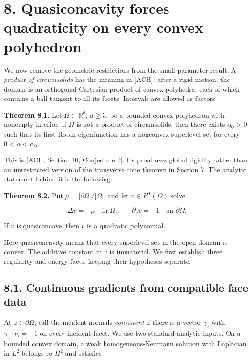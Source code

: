 \documentclass[11pt]{article}
\begin{document}
\section{8. Quasiconcavity forces quadraticity on every convex
polyhedron}\label{quasiconcavity-forces-quadraticity-on-every-convex-polyhedron}

We now remove the geometric restrictions from the small-parameter
result. A \emph{product of circumsolids} has the meaning in {[}ACH{]}:
after a rigid motion, the domain is an orthogonal Cartesian product of
convex polyhedra, each of which contains a ball tangent to all its
facets. Intervals are allowed as factors.

\textbf{Theorem 8.1.} Let \(\Omega\subset\mathbb R^d\), \(d\ge3\), be a
bounded convex polyhedron with nonempty interior. If \(\Omega\) is not a
product of circumsolids, then there exists \(\alpha_0>0\) such that its
first Robin eigenfunction has a nonconvex superlevel set for every
\(0<\alpha<\alpha_0\).

This is {[}ACH, Section 10, Conjecture 2{]}. Its proof uses global
rigidity rather than an unrestricted version of the transverse cone
theorem in Section 7. The analytic statement behind it is the following.

\textbf{Theorem 8.2.} Put \(\mu=|\partial\Omega|/|\Omega|\), and let
\(v\in H^1(\Omega)\) solve

\[
\Delta v=-\mu\quad\text{in }\Omega,
\qquad \partial_\nu v=-1\quad\text{on }\partial\Omega.
\tag{8.1}
\]

If \(v\) is quasiconcave, then \(v\) is a quadratic polynomial.

Here quasiconcavity means that every superlevel set in the open domain
is convex. The additive constant in \(v\) is immaterial. We first
establish three regularity and energy facts, keeping their hypotheses
separate.

\subsection{8.1. Continuous gradients from compatible face
data}\label{continuous-gradients-from-compatible-face-data}

At \(z\in\partial\Omega\), call the incident normals \emph{consistent}
if there is a vector \(\gamma_z\) with \(\gamma_z\cdot\nu_i=-1\) on
every incident facet. We use two standard analytic inputs. On a bounded
convex domain, a weak homogeneous-Neumann solution with Laplacian in
\(L^2\) belongs to \(H^2\) and satisfies
\end{document}
